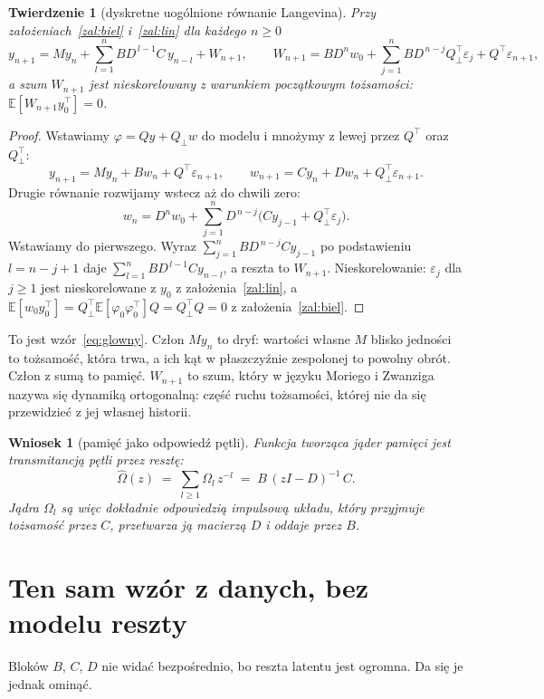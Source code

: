 \documentclass[11pt,a4paper]{article}
\newtheorem{twierdzenie}{Twierdzenie}
\newtheorem{wniosek}{Wniosek}
\theoremstyle{definition}
\theoremstyle{remark}
\newcommand{\E}{\mathbb{E}}
\newcommand{\Qp}{Q_{\perp}}
\newcommand{\T}{^{\top}}
\begin{document}
\begin{twierdzenie}[dyskretne uogólnione równanie Langevina]\label{tw:gle}
Przy założeniach~\ref{zal:biel} i~\ref{zal:lin} dla każdego $n\ge 0$
\[
y_{n+1} = M y_n + \sum_{l=1}^{n} B D^{\,l-1} C\, y_{n-l} + W_{n+1},
\qquad
W_{n+1} = B D^{n} w_0 + \sum_{j=1}^{n} B D^{\,n-j}\Qp\T\varepsilon_j + Q\T\varepsilon_{n+1},
\]
a szum $W_{n+1}$ jest nieskorelowany z warunkiem początkowym tożsamości: $\E[W_{n+1}y_0\T]=0$.
\end{twierdzenie}

\begin{proof}
Wstawiamy $\varphi = Q y + \Qp w$ do modelu i mnożymy z lewej przez $Q\T$ oraz $\Qp\T$:
\[
y_{n+1} = M y_n + B w_n + Q\T\varepsilon_{n+1},\qquad
w_{n+1} = C y_n + D w_n + \Qp\T\varepsilon_{n+1}.
\]
Drugie równanie rozwijamy wstecz aż do chwili zero:
\[
w_n = D^n w_0 + \sum_{j=1}^{n} D^{\,n-j}\bigl(C y_{j-1} + \Qp\T\varepsilon_j\bigr).
\]
Wstawiamy do pierwszego. Wyraz $\sum_{j=1}^{n} B D^{\,n-j} C y_{j-1}$ po podstawieniu $l = n-j+1$
daje $\sum_{l=1}^{n} B D^{\,l-1} C y_{n-l}$, a reszta to $W_{n+1}$. Nieskorelowanie: $\varepsilon_j$
dla $j\ge 1$ jest nieskorelowane z $y_0$ z założenia~\ref{zal:lin}, a
$\E[w_0 y_0\T] = \Qp\T\E[\varphi_0\varphi_0\T]Q = \Qp\T Q = 0$ z założenia~\ref{zal:biel}.
\end{proof}

To jest wzór~\eqref{eq:glowny}. Człon $M y_n$ to dryf: wartości własne $M$ blisko jedności to tożsamość,
która trwa, a ich kąt w płaszczyźnie zespolonej to powolny obrót. Człon z sumą to pamięć. $W_{n+1}$ to
szum, który w języku Moriego i Zwanziga nazywa się dynamiką ortogonalną: część ruchu tożsamości,
której nie da się przewidzieć z jej własnej historii.

\begin{wniosek}[pamięć jako odpowiedź pętli]\label{wn:transmitancja}
Funkcja tworząca jąder pamięci jest transmitancją pętli przez resztę:
\[
\widehat\Omega(z) \;=\; \sum_{l\ge 1}\Omega_l\, z^{-l} \;=\; B\,(zI-D)^{-1}\,C .
\]
Jądra $\Omega_l$ są więc dokładnie odpowiedzią impulsową układu, który przyjmuje tożsamość przez $C$,
przetwarza ją macierzą $D$ i oddaje przez $B$.
\end{wniosek}

\section{Ten sam wzór z danych, bez modelu reszty}

Bloków $B$, $C$, $D$ nie widać bezpośrednio, bo reszta latentu jest ogromna. Da się je jednak ominąć.
\end{document}
